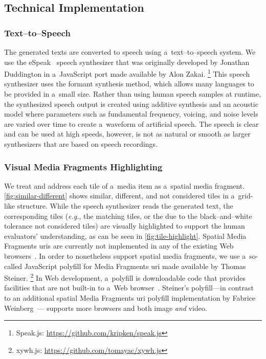 \documentclass{article}
\begin{document}
\subsection{Technical Implementation}

\subsubsection{Text--to--Speech}

The generated texts are converted to speech using a~text--to--speech system.
We use the eSpeak~\cite{duddington2012espeak}
speech synthesizer that was originally developed by Jonathan Duddington
in a~JavaScript port made available by Alon Zakai.%
\footnote{Speak.js: \url{https://github.com/kripken/speak.js}}
This speech synthesizer uses the formant synthesis method,
which allows many languages to be provided in a~small size.
Rather than using human speech samples at runtime,
the synthesized speech output is created using additive synthesis
and an acoustic model where parameters
such as fundamental frequency, voicing, and noise levels
are varied over time to create a~waveform of artificial speech. 
The speech is clear and can be used at high speeds,
however, is not as natural or smooth as larger synthesizers
that are based on speech recordings.

\subsubsection{Visual Media Fragments Highlighting}

We treat and address each tile of a~media item as a~spatial media fragment.
\autoref{fig:similar-different} shows similar, different,
and not considered tiles in a~grid-like structure.
While the speech synthesizer reads the generated text,
the corresponding tiles (\emph{e.g.}, the matching tiles,
or the due to the black--and--white tolerance not considered tiles)
are visually highlighted to support the human evaluators' understanding,
as can be seen in \autoref{fig:tile-highlight}.
Spatial Media Fragments {\sc uri}s are currently not implemented
in any of the existing Web browsers~\cite{weinberg2013polyfill}.
In order to nonetheless support spatial media fragments,
we use a~so-called JavaScript polyfill for Media Fragments {\sc uri}
made available by Thomas Steiner.%
\footnote{xywh.js: \url{https://github.com/tomayac/xywh.js}}
In Web development, a~polyfill is downloadable code
that provides facilities that are not built-in to a~Web browser~\cite{sharp2010polyfill}.
Steiner's polyfill---in contrast to an additional spatial Media Fragments {\sc uri}
polyfill implementation by Fabrice Weinberg~\cite{weinberg2013polyfill}---%
supports more browsers and both image \emph{and} video.
\end{document}
